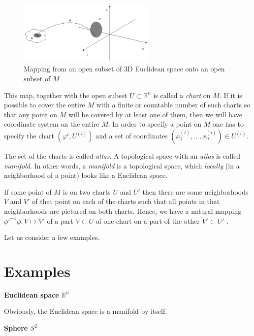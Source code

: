 \documentclass[a4paper,10pt]{article}
\begin{document}
\begin{figure}[h]
\centering
 \includegraphics[width=0.6\textwidth]{../../images/PhiMap.png}
 \caption{Mapping from an open subset of 3D Euclidean space onto an open subset of $M$}
 \label{fig:phimap}
\end{figure}

This map, together with the open subset $U\subset \mathbb{R}^n$ is called a {\it chart} on $M$. If it is possible to cover the entire $M$ with a finite or countable number of such charts so that any point on $M$ will be covered by at least one of them, then we will have coordinate system on the entire $M$. In order to specify a point on $M$ one has to specify the chart $(\varphi^i, U^{(i)})$ and a set of coordinates $(x_1^{(i)}, \ldots, x_n^{(i)})\in U^{(i)}$. 

The set of the charts is called {\it atlas}. A topological space with an {\it atlas} is called {\it manifold}. 
In other words, a {\it manifold} is a topological space, which { \it locally } (in a neighborhood of a point) looks like a Euclidean space. 

If some point of $M$ is on two charts $U$ and $U'$ then there are some neighborhoods $V$ and $V'$ of that point on each of the charts such that all points in that neighborhoods are pictured on both charts. Hence, we have a natural mapping $\phi'^{-1}\phi: V\mapsto V'$ of a part $V\subset U$ of one chart on a part of the other $V'\subset U'$ \cite{arn, egh}.

Let us consider a few examples.

\section{Examples}


{\bf Euclidean space $\mathbb{R}^n$}
\newline

Obviously, the Euclidean space is a manifold by itself. 
\newline

{\bf Sphere $S^2$}
\newline
\end{document}
